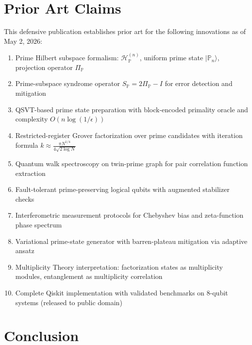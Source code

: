 \documentclass[11pt,letterpaper]{article}
\begin{document}
\section{Prior Art Claims}

This defensive publication establishes prior art for the following innovations as of May 2, 2026:

\begin{enumerate}
\item Prime Hilbert subspace formalism: $\mathcal{H}_{\mathbb{P}}^{(n)}$, uniform prime state $|\mathbb{P}_n\rangle$, projection operator $\Pi_{\mathbb{P}}$

\item Prime-subspace syndrome operator $S_{\mathbb{P}} = 2\Pi_{\mathbb{P}} - I$ for error detection and mitigation

\item QSVT-based prime state preparation with block-encoded primality oracle and complexity $O(n\log(1/\epsilon))$

\item Restricted-register Grover factorization over prime candidates with iteration formula $k \approx \frac{\pi N^{1/4}}{4\sqrt{2\log N}}$

\item Quantum walk spectroscopy on twin-prime graph for pair correlation function extraction

\item Fault-tolerant prime-preserving logical qubits with augmented stabilizer checks

\item Interferometric measurement protocols for Chebyshev bias and zeta-function phase spectrum

\item Variational prime-state generator with barren-plateau mitigation via adaptive ansatz

\item Multiplicity Theory interpretation: factorization states as multiplicity modules, entanglement as multiplicity correlation

\item Complete Qiskit implementation with validated benchmarks on 8-qubit systems (released to public domain)
\end{enumerate}

\section{Conclusion}
\end{document}

